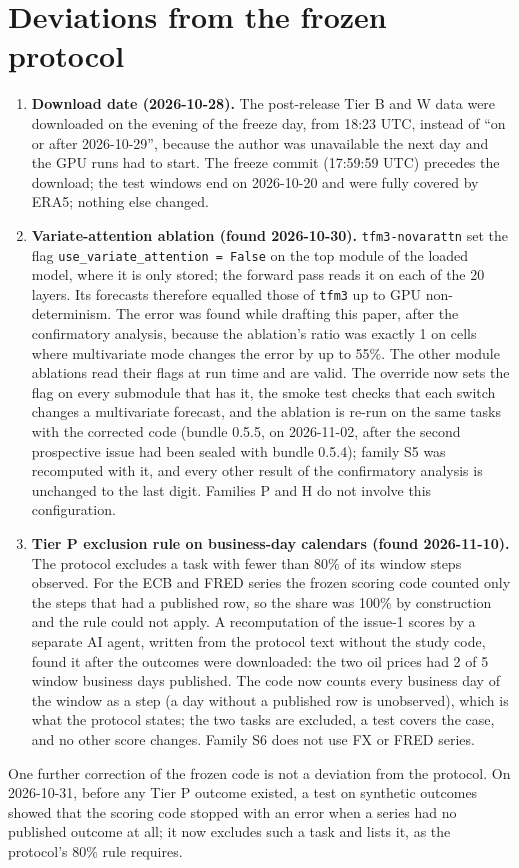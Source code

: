 \section{Deviations from the frozen protocol}
\label{app:deviations}

\begin{enumerate}
\item \textbf{Download date (2026-10-28).} The post-release Tier B and W data were downloaded on the evening of the freeze day, from
18:23 UTC, instead of ``on or after 2026-10-29'', because the author was unavailable the next day and the GPU runs had to
start. The freeze commit (17:59:59 UTC) precedes the download; the test windows end on 2026-10-20 and were fully covered by ERA5;
nothing else changed.
\item \textbf{Variate-attention ablation (found 2026-10-30).} \texttt{tfm3-novarattn} set the flag
\texttt{use\_variate\_attention = False} on the top module of the loaded model, where it is only stored; the forward pass reads it on
each of the 20 layers. Its forecasts therefore equalled those of \texttt{tfm3} up to GPU non-determinism. The error was found while
drafting this paper, after the confirmatory analysis, because the ablation's ratio was exactly 1 on cells where multivariate mode
changes the error by up to 55\%. The other module ablations read their flags at run time and are valid. The override now sets the
flag on every submodule that has it, the smoke test checks that each switch changes a multivariate forecast, and the ablation is
re-run on the same tasks with the corrected code (bundle 0.5.5, on 2026-11-02, after the second prospective issue had been
sealed with bundle 0.5.4); family S5 was recomputed with it, and every other result of the confirmatory analysis is unchanged
to the last digit. Families P and H do not involve this configuration.
\item \textbf{Tier P exclusion rule on business-day calendars (found 2026-11-10).} The protocol excludes a task with fewer than 80\%
of its window steps observed. For the ECB and FRED series the frozen scoring code counted only the steps that had a published
row, so the share was 100\% by construction and the rule could not apply. A recomputation of the issue-1 scores by a separate AI agent, written from the protocol text without the study code,
found it after the outcomes were downloaded: the two oil prices had 2 of 5 window business days published. The code now counts
every business day of the window as a step (a day without a published row is unobserved), which is what the protocol states;
the two tasks are excluded, a test covers the case, and no other score changes. Family S6 does not use FX or FRED series.
\end{enumerate}
One further correction of the frozen code is not a deviation from the protocol. On 2026-10-31, before any Tier P outcome existed, a
test on synthetic outcomes showed that the scoring code stopped with an error when a series had no published outcome at all; it now
excludes such a task and lists it, as the protocol's 80\% rule requires.

